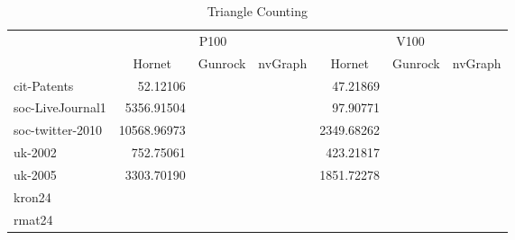 \begin{table}[t]
\begin{center}
\caption{Triangle Counting}
\begin{tabular}{l|r|r|r|r|r|r|}
\cline{2-7}
                                          & \multicolumn{3}{c|}{P100}                                                                 & \multicolumn{3}{c|}{V100}                                                                 \\ \cline{2-7} 
                                          & \multicolumn{1}{c|}{Hornet} & \multicolumn{1}{c|}{Gunrock} & \multicolumn{1}{c|}{nvGraph} & \multicolumn{1}{c|}{Hornet} & \multicolumn{1}{c|}{Gunrock} & \multicolumn{1}{c|}{nvGraph} \\ \hline
\multicolumn{1}{|l|}{cit-Patents}         &52.12106&         &         &47.21869&   &         \\ \hline %
\multicolumn{1}{|l|}{soc-LiveJournal1}    &5356.91504&         &         &97.90771&     &         \\ \hline %
\multicolumn{1}{|l|}{soc-twitter-2010}    &10568.96973&         &         &2349.68262&    &         \\ \hline %
\multicolumn{1}{|l|}{uk-2002}             &752.75061&         &         &423.21817&  &         \\ \hline %
\multicolumn{1}{|l|}{uk-2005}             &3303.70190&         &         &1851.72278& &         \\ \hline %
\multicolumn{1}{|l|}{kron24}              &        &         &         &        &         &         \\ \hline %
\multicolumn{1}{|l|}{rmat24}              &        &         &         &        &         &         \\ \hline %
\end{tabular}



\end{center}
\end{table}
